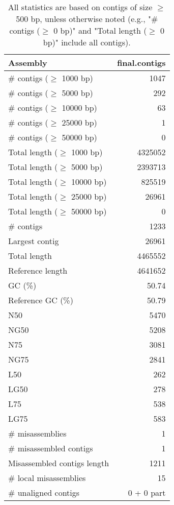 \documentclass[12pt,a4paper]{article}
\begin{document}
\begin{table}[ht]
\begin{center}
\caption{All statistics are based on contigs of size $\geq$ 500 bp, unless otherwise noted (e.g., "\# contigs ($\geq$ 0 bp)" and "Total length ($\geq$ 0 bp)" include all contigs).}
\begin{tabular}{|l*{1}{|r}|}
\hline
Assembly & final.contigs \\ \hline
\# contigs ($\geq$ 1000 bp) & 1047 \\ \hline
\# contigs ($\geq$ 5000 bp) & 292 \\ \hline
\# contigs ($\geq$ 10000 bp) & 63 \\ \hline
\# contigs ($\geq$ 25000 bp) & 1 \\ \hline
\# contigs ($\geq$ 50000 bp) & 0 \\ \hline
Total length ($\geq$ 1000 bp) & 4325052 \\ \hline
Total length ($\geq$ 5000 bp) & 2393713 \\ \hline
Total length ($\geq$ 10000 bp) & 825519 \\ \hline
Total length ($\geq$ 25000 bp) & 26961 \\ \hline
Total length ($\geq$ 50000 bp) & 0 \\ \hline
\# contigs & 1233 \\ \hline
Largest contig & 26961 \\ \hline
Total length & 4465552 \\ \hline
Reference length & 4641652 \\ \hline
GC (\%) & 50.74 \\ \hline
Reference GC (\%) & 50.79 \\ \hline
N50 & 5470 \\ \hline
NG50 & 5208 \\ \hline
N75 & 3081 \\ \hline
NG75 & 2841 \\ \hline
L50 & 262 \\ \hline
LG50 & 278 \\ \hline
L75 & 538 \\ \hline
LG75 & 583 \\ \hline
\# misassemblies & 1 \\ \hline
\# misassembled contigs & 1 \\ \hline
Misassembled contigs length & 1211 \\ \hline
\# local misassemblies & 15 \\ \hline
\# unaligned contigs & 0 + 0 part \\ \hline

\end{tabular}
\end{center}
\end{table}
\end{document}
